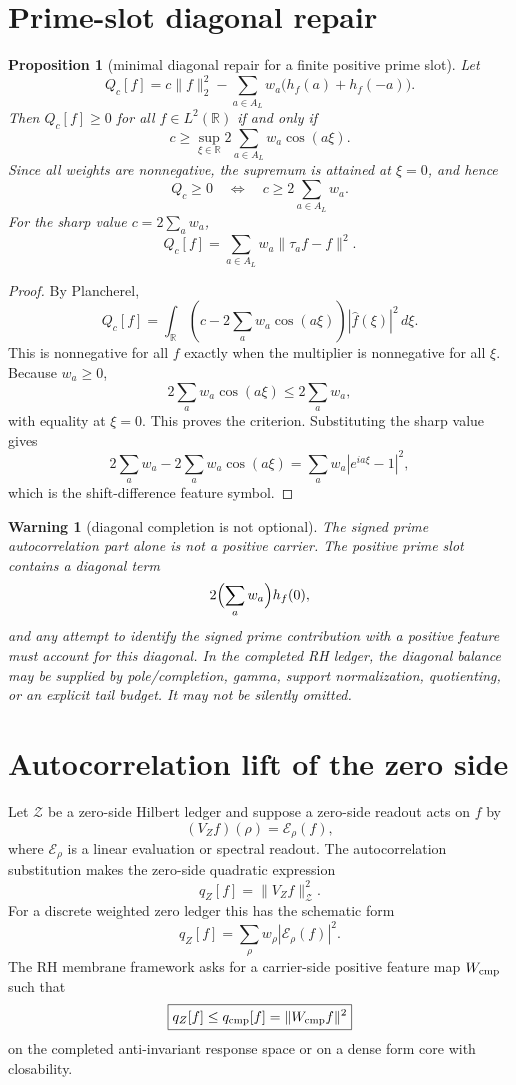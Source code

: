 \documentclass[11pt]{article}
\newtheorem{proposition}{Proposition}
\newtheorem{warning}{Warning}
\newcommand{\R}{\mathbb R}
\newcommand{\norm}[1]{\lVert #1\rVert}
\begin{document}
\section{Prime-slot diagonal repair}
\begin{proposition}[minimal diagonal repair for a finite positive prime slot]
Let
\[
  Q_c[f]
  =c\norm f_2^2-
    \sum_{a\in A_L}w_a\bigl(h_f(a)+h_f(-a)\bigr).
\]
Then \(Q_c[f]\ge0\) for all \(f\in L^2(\R)\) if and only if
\[
  c\ge \sup_{\xi\in\R}2\sum_{a\in A_L}w_a\cos(a\xi).
\]
Since all weights are nonnegative, the supremum is attained at \(\xi=0\), and hence
\[
  \boxed{
  Q_c\ge0\quad\Longleftrightarrow\quad c\ge2\sum_{a\in A_L}w_a.
  }
\]
For the sharp value \(c=2\sum_a w_a\),
\[
  Q_c[f]=\sum_{a\in A_L}w_a\norm{\tau_a f-f}^2.
\]
\end{proposition}

\begin{proof}
By Plancherel,
\[
  Q_c[f]=\int_{\R}\left(c-2\sum_aw_a\cos(a\xi)\right)|\widehat f(\xi)|^2\,d\xi.
\]
This is nonnegative for all \(f\) exactly when the multiplier is nonnegative for all \(\xi\).  Because \(w_a\ge0\),
\[
  2\sum_aw_a\cos(a\xi)\le2\sum_aw_a,
\]
with equality at \(\xi=0\).  This proves the criterion.  Substituting the sharp value gives
\[
  2\sum_aw_a-2\sum_aw_a\cos(a\xi)
  =\sum_aw_a|e^{ia\xi}-1|^2,
\]
which is the shift-difference feature symbol.
\end{proof}

\begin{warning}[diagonal completion is not optional]
The signed prime autocorrelation part alone is not a positive carrier.  The positive prime slot contains a diagonal term
\[
  2\Bigl(\sum_a w_a\Bigr)h_f(0),
\]
and any attempt to identify the signed prime contribution with a positive feature must account for this diagonal.  In the completed RH ledger, the diagonal balance may be supplied by pole/completion, gamma, support normalization, quotienting, or an explicit tail budget.  It may not be silently omitted.
\end{warning}

\section{Autocorrelation lift of the zero side}
Let \(\mathcal Z\) be a zero-side Hilbert ledger and suppose a zero-side readout acts on \(f\) by
\[
  (V_Z f)(\rho)=\mathcal E_\rho(f),
\]
where \(\mathcal E_\rho\) is a linear evaluation or spectral readout.  The autocorrelation substitution makes the zero-side quadratic expression
\[
  q_Z[f]=\norm{V_Z f}_{\mathcal Z}^2.
\]
For a discrete weighted zero ledger this has the schematic form
\[
  q_Z[f]=\sum_{\rho}w_\rho |\mathcal E_\rho(f)|^2.
\]
The RH membrane framework asks for a carrier-side positive feature map \(W_{\rm cmp}\) such that
\[
  \boxed{q_Z[f]\le q_{\rm cmp}[f]=\norm{W_{\rm cmp}f}^2}
\]
on the completed anti-invariant response space or on a dense form core with closability.
\end{document}
